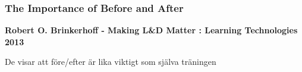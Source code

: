 \subsubsection{The Importance of Before and After}

\textbf{Robert O. Brinkerhoff - Making L\&D Matter : Learning Technologies 2013}

De visar att före/efter är lika viktigt som själva träningen




